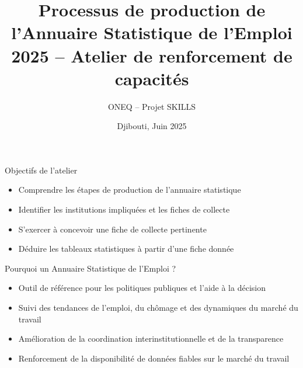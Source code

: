 \documentclass{beamer}
\title[Annuaire Statistique de l'Emploi]{Processus de production de l'Annuaire Statistique de l'Emploi 2025 -- Atelier de renforcement de capacit\'es}
\author{ONEQ -- Projet SKILLS}
\date{Djibouti, Juin 2025}
\begin{document}
\frame{\titlepage}

\begin{frame}{Objectifs de l'atelier}
\begin{itemize}
  \item Comprendre les \'etapes de production de l'annuaire statistique
  \item Identifier les institutions impliqu\'ees et les fiches de collecte
  \item S'exercer à concevoir une fiche de collecte pertinente
  \item D\'eduire les tableaux statistiques \`a partir d'une fiche donn\'ee
\end{itemize}
\end{frame}


\begin{frame}{Pourquoi un Annuaire Statistique de l’Emploi ?}
\begin{itemize}
  \item Outil de r\'ef\'erence pour les politiques publiques et l’aide \`a la d\'ecision
  \item Suivi des tendances de l’emploi, du ch\^omage et des dynamiques du march\'e du travail
  \item Am\'elioration de la coordination interinstitutionnelle et de la transparence
  \item Renforcement de la disponibilit\'e de donn\'ees fiables sur le march\'e du travail
\end{itemize}
\end{frame}
\end{document}
